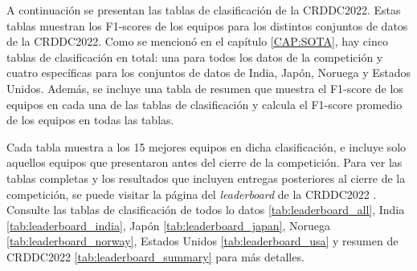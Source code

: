 
A continuación se presentan las tablas de clasificación de la CRDDC2022. Estas tablas muestran los F1-scores de los equipos para los distintos conjuntos de datos de la CRDDC2022. Como se mencionó en el capítulo \ref{CAP:SOTA}, hay cinco tablas de clasificación en total: una para todos los datos de la competición y cuatro específicas para los conjuntos de datos de India, Japón, Noruega y Estados Unidos. Además, se incluye una tabla de resumen que muestra el F1-score de los equipos en cada una de las tablas de clasificación y calcula el F1-score promedio de los equipos en todas las tablas.

Cada tabla muestra a los 15 mejores equipos en dicha clasificación, e incluye solo aquellos equipos que presentaron antes del cierre de la competición. Para ver las tablas completas y los resultados que incluyen entregas posteriores al cierre de la competición, se puede visitar la página del \textit{leaderboard} de la CRDDC2022 \cite{Leaderboard_CRDDC2022}. Consulte las tablas de clasificación de todos lo datos \ref{tab:leaderboard_all}, India \ref{tab:leaderboard_india}, Japón \ref{tab:leaderboard_japan}, Noruega \ref{tab:leaderboard_norway}, Estados Unidos \ref{tab:leaderboard_usa} y resumen de CRDDC2022 \ref{tab:leaderboard_summary} para más detalles.


